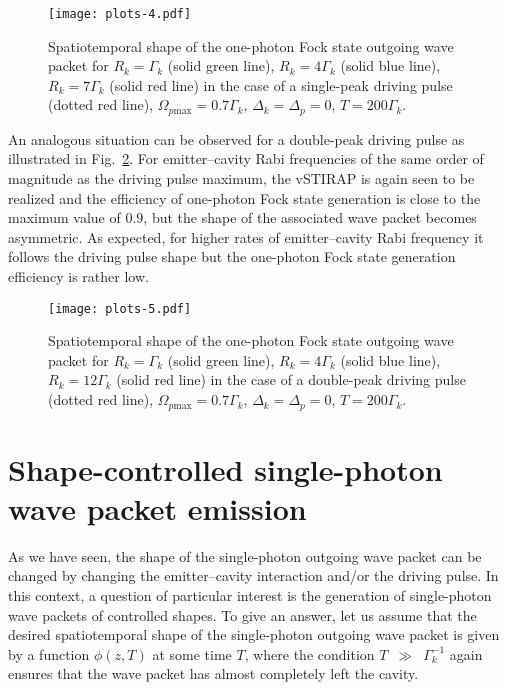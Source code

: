 \documentclass[pra, twocolumn]{revtex4}
\begin{document}
\begin{figure}[t!]
	\texttt{[image: plots-4.pdf]}
	\caption{Spatiotemporal shape of the
          one-photon Fock state
          outgoing wave packet
          for
          $R_k = \Gamma_k$ (solid green line), $R_k = 4\Gamma_k$
          (solid blue line),  $R_k = 7\Gamma_k$ (solid red line)
          in the case of a single-peak driving pulse (dotted red line),
          $\Omega_{p\mathrm{max}} = 0.7\Gamma_k$, $\Delta_k = \Delta_p = 0$, $T = 200 \Gamma_k$.}
	\label{fig4}
\end{figure}

An analogous situation can be observed for a double-peak driving
pulse as illustrated in Fig.~\ref{fig5}.
For emitter--cavity
Rabi frequencies
of the same order of magnitude as the driving pulse maximum, the
vSTIRAP is
again seen to be
realized and
the efficiency of one-photon Fock state generation is
close to the maximum value of $0.9$,
but the shape of the associated wave packet
becomes asymmetric.
%
As expected, for
higher rates of emitter--cavity Rabi frequency
it
follows the driving pulse
%
shape
but the
one-photon Fock state generation efficiency is
%
rather
low.

\begin{figure}[t!]
	\texttt{[image: plots-5.pdf]}
 	\caption{Spatiotemporal shape of the
          one-photon Fock state
          outgoing wave packet
          for
          $R_k = \Gamma_k$
          (solid green line), $R_k = 4\Gamma_k$ (solid blue line),
          $R_k = 12\Gamma_k$ (solid red line)
          in the case of a double-peak driving pulse (dotted red line),
          $\Omega_{p\mathrm{max}} = 0.7\Gamma_k$, $\Delta_k = \Delta_p = 0$, $T = 200 \Gamma_k$.}
	\label{fig5}
\end{figure}


\section{
Shape-controlled single-photon wave packet emission
}
\label{sec7}


As we have seen, the
%
shape
of the
single-photon
outgoing
wave packet
can be changed by changing
the emitter--cavity interaction
and/or
the
driving pulse.
In this context, a question
of particular interest is
the
generation of single-photon wave packets
of controlled shapes.
%
To give an answer, let us
assume that the desired spatiotemporal shape of the
single-photon
outgoing
wave packet is given by a function $\phi(z,T)$ at
%
some
time $T$, where
the condition
\mbox{$T$ $\!\gg$ $\!\Gamma_k^{-1}$}
%
again ensures
that the wave packet
%
has
almost completely
%
left
the cavity.
\end{document}
